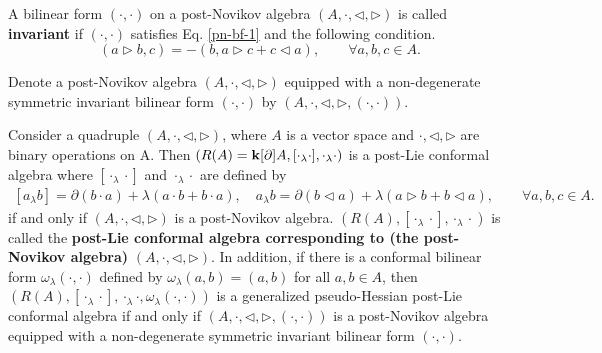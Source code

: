 \documentclass[12pt]{amsart}
\begin{document}
\begin{definition}
    A bilinear form $(\cdot,\cdot)$ on a post-Novikov algebra $(A,\cdot,\lhd,\rhd)$ is called {\bf invariant} if $(\cdot,\cdot)$ satisfies Eq.  \eqref{pn-bf-1} and the following condition.
    \begin{equation}\label{pn-bf2}
        (a\rhd b,c)=-(b,a\rhd c+c\lhd a), \qquad \forall a,b,c\in A.
    \end{equation}

    Denote a post-Novikov algebra $(A,\cdot,\lhd,\rhd)$ equipped with a non-degenerate symmetric invariant bilinear form $(\cdot,\cdot)$ by
    $(A,\cdot,\lhd,\rhd,(\cdot,\cdot))$.
\end{definition}
\begin{proposition}\label{pl-n}
Consider a quadruple $ (A,\cdot,\lhd,\rhd)$, where $A$ is a vector space and $\cdot,\lhd,\rhd $ are binary operations on A. Then $(R(A)={\bf k}[\partial ]A, [\cdot_\lambda \cdot], \cdot_\lambda \cdot)$ is a post-Lie conformal algebra where $[\cdot_\lambda \cdot]$ and $\cdot_\lambda \cdot$ are defined by
\begin{align}\label{eq-pn}
    [a_\lambda b]=\partial(b\cdot a)+\lambda(a\cdot b+b\cdot a),\quad a_\lambda b=\partial(b\lhd a)+\lambda(a\rhd b+b\lhd a),\qquad\forall a,b,c\in A.
\end{align}
if and only if  $ (A,\cdot,\lhd,\rhd)$ is a post-Novikov algebra.
$(R(A),[\cdot_\lambda \cdot],\cdot_\lambda \cdot)$ is called the
{\bf post-Lie conformal algebra corresponding to (the post-Novikov
algebra) } $(A,\cdot,\lhd,\rhd)$. In addition, if there is a
conformal bilinear form $\omega_\lambda(\cdot,\cdot)$ defined by
$\omega_\lambda(a,b)= (a,b)$ for all $a,b\in A$, then
$(R(A),[\cdot_\lambda \cdot],\cdot_\lambda \cdot,
\omega_\lambda(\cdot,\cdot))$ is a generalized pseudo-Hessian
post-Lie conformal algebra if and only if  $(A,\cdot,\lhd,\rhd,(\cdot,\cdot))$
is a  post-Novikov algebra equipped with a non-degenerate
symmetric invariant bilinear form $(\cdot,\cdot)$.

\end{proposition}
\end{document}
